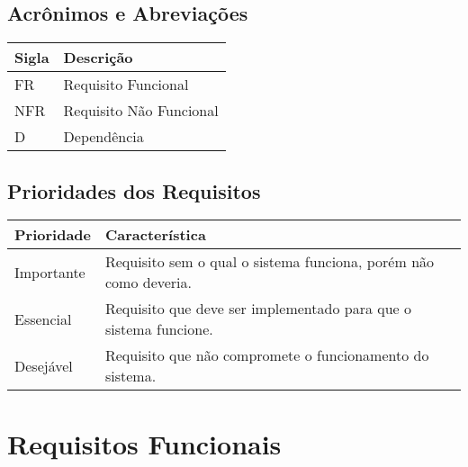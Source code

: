 \documentclass{article}
\begin{document}
  \subsection{Acrônimos e Abreviações}
    \FloatBarrier
    \begin{table}[H]
      \begin{center}
        \begin{tabular}[pos]{|m{2cm} | m{12cm}|} 
          \hline
          \cellcolor[gray]{0.9}\textbf{Sigla} & \cellcolor[gray]{0.9}\textbf{Descrição} \\ \hline
          FR      & Requisito Funcional  \\ \hline
          NFR     & Requisito Não Funcional  \\ \hline
          D       & Dependência  \\ \hline
        \end{tabular}
      \end{center}
    \end{table}  

  \subsection{Prioridades dos Requisitos}
    \FloatBarrier
    \begin{table}[H]
      \begin{center}
        \begin{tabular}[pos]{|m{2cm} | m{12cm}|} 
          \hline
          \cellcolor[gray]{0.9}\textbf{Prioridade} & \cellcolor[gray]{0.9}\textbf{Característica} \\ \hline
          Importante      & Requisito sem o qual o sistema funciona, porém não como deveria.  \\ \hline
          Essencial       & Requisito que deve ser implementado para que o sistema funcione.  \\ \hline
          Desejável       & Requisito que não compromete o funcionamento do sistema.  \\ \hline
        \end{tabular}
      \end{center}
    \end{table}  

\section{Requisitos Funcionais}
\end{document}
